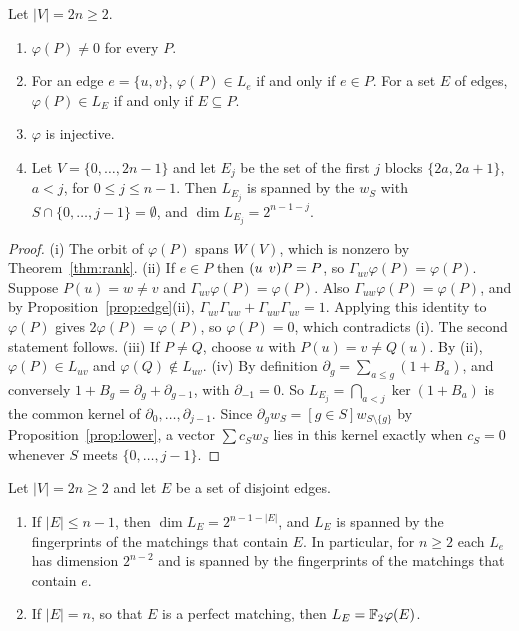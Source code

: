 \begin{theorem}\label{thm:stars}
Let $|V|=2n\ge2$.
\begin{enumerate}
\item $\varphi(P)\ne0$ for every $P$.
\item For an edge $e=\{u,v\}$, $\varphi(P)\in L_e$ if and only if $e\in P$. For a set $E$ of edges, $\varphi(P)\in L_E$ if and only if $E\subseteq P$.
\item $\varphi$ is injective.
\item Let $V=\{0,\dots,2n-1\}$ and let $E_j$ be the set of the first $j$ blocks $\{2a,2a+1\}$, $a<j$, for $0\le j\le n-1$. Then $L_{E_j}$ is spanned by the $w_S$ with $S\cap\{0,\dots,j-1\}=\emptyset$, and $\dim L_{E_j}=2^{n-1-j}$.
\end{enumerate}
\end{theorem}

\begin{proof}
(i) The orbit of $\varphi(P)$ spans $W(V)$, which is nonzero by Theorem~\ref{thm:rank}. (ii) If $e\in P$ then $(u\;\,v)P=P$, so $\Gamma_{uv}\varphi(P)=\varphi(P)$. Suppose $P(u)=w\ne v$ and $\Gamma_{uv}\varphi(P)=\varphi(P)$. Also $\Gamma_{uw}\varphi(P)=\varphi(P)$, and by Proposition~\ref{prop:edge}(ii), $\Gamma_{uv}\Gamma_{uw}+\Gamma_{uw}\Gamma_{uv}=1$. Applying this identity to $\varphi(P)$ gives $2\varphi(P)=\varphi(P)$, so $\varphi(P)=0$, which contradicts (i). The second statement follows. (iii) If $P\ne Q$, choose $u$ with $P(u)=v\ne Q(u)$. By (ii), $\varphi(P)\in L_{uv}$ and $\varphi(Q)\notin L_{uv}$. (iv) By definition $\partial_g=\sum_{a\le g}(1+B_a)$, and conversely $1+B_g=\partial_g+\partial_{g-1}$, with $\partial_{-1}=0$. So $L_{E_j}=\bigcap_{a<j}\ker(1+B_a)$ is the common kernel of $\partial_0,\dots,\partial_{j-1}$. Since $\partial_{g}w_S=[g\in S]w_{S\setminus\{g\}}$ by Proposition~\ref{prop:lower}, a vector $\sum c_{S}w_S$ lies in this kernel exactly when $c_S=0$ whenever $S$ meets $\{0,\dots,j-1\}$.
\end{proof}

\begin{corollary}\label{cor:LE}
Let $|V|=2n\ge2$ and let $E$ be a set of disjoint edges.
\begin{enumerate}
\item If $|E|\le n-1$, then $\dim L_E=2^{n-1-|E|}$, and $L_E$ is spanned by the fingerprints of the matchings that contain $E$. In particular, for $n\ge2$ each $L_e$ has dimension $2^{n-2}$ and is spanned by the fingerprints of the matchings that contain $e$.
\item If $|E|=n$, so that $E$ is a perfect matching, then $L_E=\mathbb{F}_2\varphi(E)$.
\end{enumerate}
\end{corollary}

